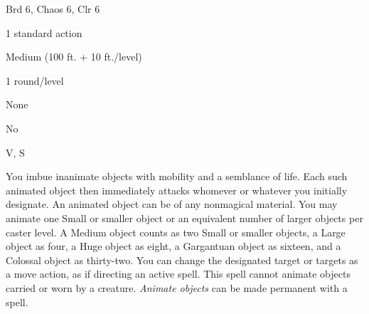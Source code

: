 
\begin{description*}
\item[Level:] Brd 6, Chaos 6, Clr 6
\item[Casting Time:] 1 standard action
\item[Range:] Medium (100 ft. + 10 ft./level)
\item[Duration:] 1 round/level
\item[Saving Throw:] None
\item[Spell Resistance:] No
\item[Components:] V, S
\end{description*}

You imbue inanimate objects with mobility and a semblance of life. Each such animated
object then immediately attacks whomever or whatever you initially designate.
An animated object can be of any nonmagical material. You may animate one Small
or smaller object or an equivalent number of larger objects per caster level. A
Medium object counts as two Small or smaller objects, a Large object as four, a
Huge object as eight, a Gargantuan object as sixteen, and a Colossal object as
thirty-two. You can change the designated target or targets as a move action, as
if directing an active spell.
This spell cannot animate objects carried or worn by a creature.
\textit{Animate objects} can be made permanent with a  spell.